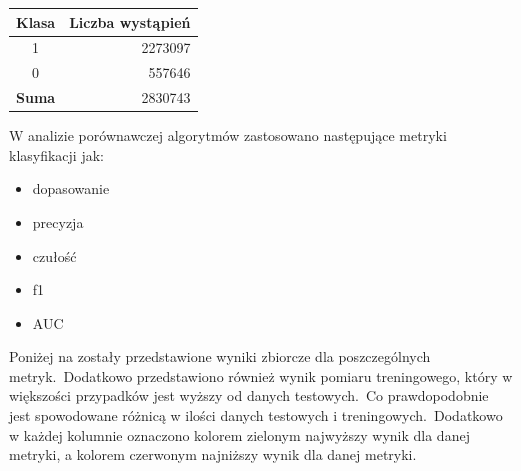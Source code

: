 \begin{table}[H]
    \centering
    \label{tab:res-test}
    \begin{tabular}{|c|r|}
        \hline
        \textbf{Klasa} & \textbf{Liczba wystąpień} \\ \hline
        1              & 2273097                   \\ \hline
        0              & 557646                    \\ \hline
        \textbf{Suma}  & 2830743                   \\ \hline
    \end{tabular}
\end{table}

W analizie porównawczej algorytmów zastosowano następujące metryki klasyfikacji jak:
\begin{itemize}
    \item dopasowanie
    \item precyzja
    \item czułość
    \item f1
    \item AUC
\end{itemize}

Poniżej na  zostały przedstawione wyniki zbiorcze dla poszczególnych metryk.\ Dodatkowo przedstawiono również wynik pomiaru treningowego, który w większości przypadków jest wyższy od danych testowych.\ Co prawdopodobnie jest spowodowane różnicą w ilości danych testowych i treningowych.\ Dodatkowo w każdej kolumnie oznaczono kolorem zielonym najwyższy wynik dla danej metryki, a kolorem czerwonym najniższy wynik dla danej metryki.

